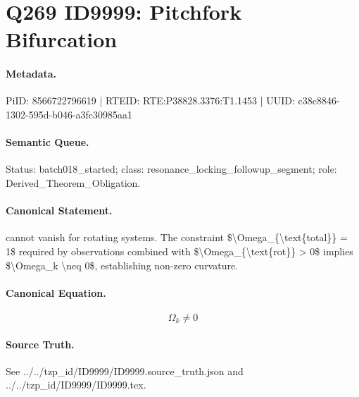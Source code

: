 \section*{Q269 ID9999: Pitchfork Bifurcation}
\paragraph{Metadata.}
PiID: 8566722796619 | RTEID: RTE:P38828.3376:T1.1453 | UUID: c38c8846-1302-595d-b046-a3fc30985aa1

\paragraph{Semantic Queue.}
Status: batch018\_started; class: resonance\_locking\_followup\_segment; role: Derived\_Theorem\_Obligation.

\paragraph{Canonical Statement.}
cannot vanish for rotating systems. The constraint \$\textbackslash{}Omega\_\{\textbackslash{}text\{total\}\} = 1\$ required by observations combined with \$\textbackslash{}Omega\_\{\textbackslash{}text\{rot\}\} > 0\$ implies \$\textbackslash{}Omega\_k \textbackslash{}neq 0\$, establishing non-zero curvature.

\paragraph{Canonical Equation.}
\[
\Omega_k \neq 0
\]

\paragraph{Source Truth.}
See ../../tzp\_id/ID9999/ID9999.source\_truth.json and ../../tzp\_id/ID9999/ID9999.tex.

